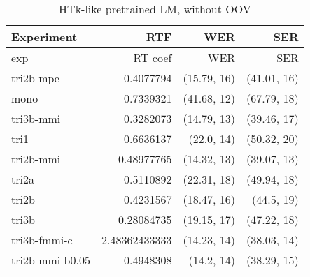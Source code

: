 \begin{table}[!htp]\label{tab:best_nooov}\centering\begin{tabular}{l|rrr}
Experiment      & \ac{RTF}       & \ac{WER}         & \ac{SER} \\
\hline
exp             & RT coef       & WER         & SER        \\
tri2b-mpe       & 0.4077794     & (15.79, 16) & (41.01, 16)\\
mono            & 0.7339321     & (41.68, 12) & (67.79, 18)\\
tri3b-mmi       & 0.3282073     & (14.79, 13) & (39.46, 17)\\
tri1            & 0.6636137     & (22.0, 14)  & (50.32, 20)\\
tri2b-mmi       & 0.48977765    & (14.32, 13) & (39.07, 13)\\
tri2a           & 0.5110892     & (22.31, 18) & (49.94, 18)\\
tri2b           & 0.4231567     & (18.47, 16) & (44.5, 19) \\
tri3b           & 0.28084735    & (19.15, 17) & (47.22, 18)\\
tri3b-fmmi-c    & 2.48362433333 & (14.23, 14) & (38.03, 14)\\
tri2b-mmi-b0.05 & 0.4948308     & (14.2, 14)  & (38.29, 15)\\
\end{tabular}
\caption{\ac{HTk}-like pretrained \ac{LM}, without \ac{OOV}}
\end{table}  

